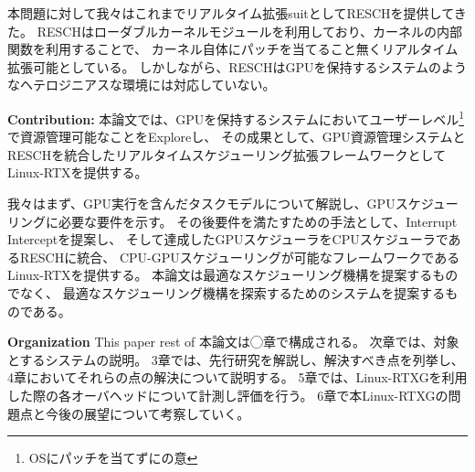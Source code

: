 本問題に対して我々はこれまでリアルタイム拡張suitとしてRESCHを提供してきた。
RESCHはローダブルカーネルモジュールを利用しており、カーネルの内部関数を利用することで、
カーネル自体にパッチを当てること無くリアルタイム拡張可能としている。
しかしながら、RESCHはGPUを保持するシステムのようなヘテロジニアスな環境には対応していない。

\textbf{Contribution:}
本論文では、GPUを保持するシステムにおいてユーザーレベル\footnote{OSにパッチを当てずにの意}で資源管理可能なことをExploreし、
その成果として、GPU資源管理システムとRESCHを統合したリアルタイムスケジューリング拡張フレームワークとしてLinux-RTXを提供する。

我々はまず、GPU実行を含んだタスクモデルについて解説し、GPUスケジューリングに必要な要件を示す。
その後要件を満たすための手法として、Interrupt Interceptを提案し、
そして達成したGPUスケジューラをCPUスケジューラであるRESCHに統合、
CPU-GPUスケジューリングが可能なフレームワークであるLinux-RTXを提供する。
本論文は最適なスケジューリング機構を提案するものでなく、
最適なスケジューリング機構を探索するためのシステムを提案するものである。


\textbf{Organization}
This paper rest of 
本論文は◯章で構成される。
次章では、対象とするシステムの説明。
3章では、先行研究を解説し、解決すべき点を列挙し、
4章においてそれらの点の解決について説明する。
5章では、Linux-RTXGを利用した際の各オーバヘッドについて計測し評価を行う。
6章で本Linux-RTXGの問題点と今後の展望について考察していく。
